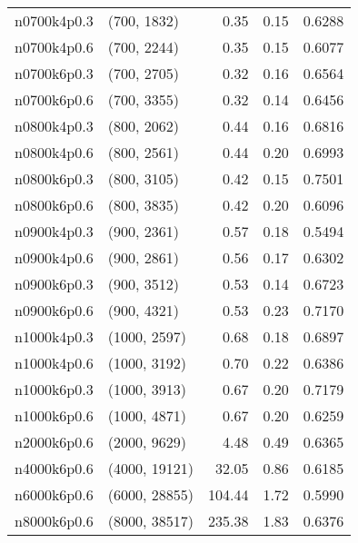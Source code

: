 \begin{tabular}{llrrr}
n0700k4p0.3 &   (700, 1832) &      0.35 &     0.15 & 0.6288 \\
n0700k4p0.6 &   (700, 2244) &      0.35 &     0.15 & 0.6077 \\
n0700k6p0.3 &   (700, 2705) &      0.32 &     0.16 & 0.6564 \\
n0700k6p0.6 &   (700, 3355) &      0.32 &     0.14 & 0.6456 \\
n0800k4p0.3 &   (800, 2062) &      0.44 &     0.16 & 0.6816 \\
n0800k4p0.6 &   (800, 2561) &      0.44 &     0.20 & 0.6993 \\
n0800k6p0.3 &   (800, 3105) &      0.42 &     0.15 & 0.7501 \\
n0800k6p0.6 &   (800, 3835) &      0.42 &     0.20 & 0.6096 \\
n0900k4p0.3 &   (900, 2361) &      0.57 &     0.18 & 0.5494 \\
n0900k4p0.6 &   (900, 2861) &      0.56 &     0.17 & 0.6302 \\
n0900k6p0.3 &   (900, 3512) &      0.53 &     0.14 & 0.6723 \\
n0900k6p0.6 &   (900, 4321) &      0.53 &     0.23 & 0.7170 \\
n1000k4p0.3 &  (1000, 2597) &      0.68 &     0.18 & 0.6897 \\
n1000k4p0.6 &  (1000, 3192) &      0.70 &     0.22 & 0.6386 \\
n1000k6p0.3 &  (1000, 3913) &      0.67 &     0.20 & 0.7179 \\
n1000k6p0.6 &  (1000, 4871) &      0.67 &     0.20 & 0.6259 \\
n2000k6p0.6 &  (2000, 9629) &      4.48 &     0.49 & 0.6365 \\
n4000k6p0.6 & (4000, 19121) &     32.05 &     0.86 & 0.6185 \\
n6000k6p0.6 & (6000, 28855) &    104.44 &     1.72 & 0.5990 \\
n8000k6p0.6 & (8000, 38517) &    235.38 &     1.83 & 0.6376 \\
\bottomrule
\end{tabular}

